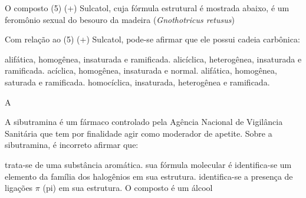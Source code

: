 \documentclass[10pt]{scrartcl}
\begin{document}
\begin{exercise}[points=1]
O composto (5) (+) Sulcatol, cuja fórmula estrutural é mostrada abaixo, é um
feromônio sexual do besouro da madeira (\emph{Gnothotricus retusus})

\begin{center}
\end{center}

Com relação ao (5) (+) Sulcatol, pode-se afirmar que ele possui cadeia carbônica:
\begin{choice}
\choice alifática, homogênea, insaturada e ramificada.
\choice alicíclica, heterogênea, insaturada e ramificada.
\choice acíclica, homogênea, insaturada e normal.
\choice alifática, homogênea, saturada e ramificada.
\choice homocíclica, insaturada, heterogênea e ramificada.
\end{choice}
\end{exercise}
\begin{solution}
A
\end{solution}








\begin{exercise}[points=1]
A sibutramina é um fármaco controlado pela Agência Nacional de Vigilância Sanitária que tem por finalidade agir como moderador de apetite.
Sobre a sibutramina, é incorreto afirmar que:


\begin{choice}
\choice trata-se de uma substância aromática.
\choice sua fórmula molecular é 
\choice  identifica-se um elemento da família dos halogênios em sua
estrutura.
\choice identifica-se a presença de ligações \(\pi\) (pi) em sua estrutura.
\choice O composto é um álcool
\end{choice}
\end{exercise}
\begin{solution}

\end{solution}
\end{document}
